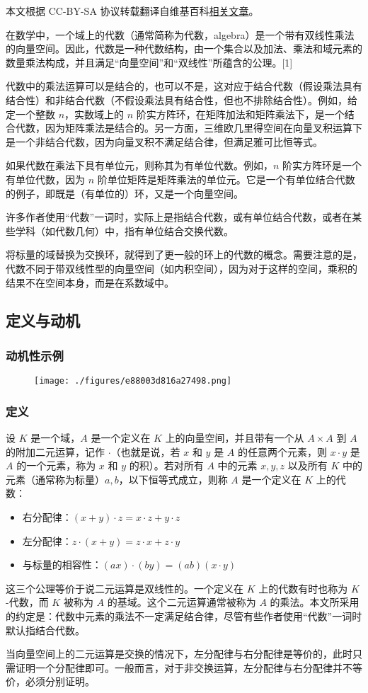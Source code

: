 
本文根据 CC-BY-SA 协议转载翻译自维基百科\href{https://en.wikipedia.org/wiki/Algebra_over_a_field}{相关文章}。

在数学中，一个域上的代数（通常简称为代数，algebra）是一个带有双线性乘法的向量空间。因此，代数是一种代数结构，由一个集合以及加法、乘法和域元素的数量乘法构成，并且满足“向量空间”和“双线性”所蕴含的公理。[1]

代数中的乘法运算可以是结合的，也可以不是，这对应于结合代数（假设乘法具有结合性）和非结合代数（不假设乘法具有结合性，但也不排除结合性）。例如，给定一个整数 $n$，实数域上的 $n$ 阶实方阵环，在矩阵加法和矩阵乘法下，是一个结合代数，因为矩阵乘法是结合的。另一方面，三维欧几里得空间在向量叉积运算下是一个非结合代数，因为向量叉积不满足结合律，但满足雅可比恒等式。

如果代数在乘法下具有单位元，则称其为有单位代数。例如，$n$ 阶实方阵环是一个有单位代数，因为 $n$ 阶单位矩阵是矩阵乘法的单位元。它是一个有单位结合代数的例子，即既是（有单位的）环，又是一个向量空间。

许多作者使用“代数”一词时，实际上是指结合代数，或有单位结合代数，或者在某些学科（如代数几何）中，指有单位结合交换代数。

将标量的域替换为交换环，就得到了更一般的环上的代数的概念。需要注意的是，代数不同于带双线性型的向量空间（如内积空间），因为对于这样的空间，乘积的结果不在空间本身，而是在系数域中。
\subsection{定义与动机}
\subsubsection{动机性示例}
\begin{figure}[ht]
\centering
\texttt{[image: ./figures/e88003d816a27498.png]}
\caption{} \label{fig_YSds_1}
\end{figure}
\subsubsection{定义}
设 $K$ 是一个域，$A$ 是一个定义在 $K$ 上的向量空间，并且带有一个从 $A \times A$ 到 $A$ 的附加二元运算，记作 $\cdot$（也就是说，若 $x$ 和 $y$ 是 $A$ 的任意两个元素，则 $x \cdot y$ 是 $A$ 的一个元素，称为 $x$ 和 $y$ 的积）。若对所有 $A$ 中的元素 $x, y, z$ 以及所有 $K$ 中的元素（通常称为标量）$a, b$，以下恒等式成立，则称 $A$ 是一个定义在 $K$ 上的代数：
\begin{itemize}
\item 右分配律：$(x + y) \cdot z = x \cdot z + y \cdot z$
\item 左分配律：$z \cdot (x + y) = z \cdot x + z \cdot y$
\item 与标量的相容性：$(a x) \cdot (b y) = (ab)(x \cdot y)$
\end{itemize}
这三个公理等价于说二元运算是双线性的。一个定义在 $K$ 上的代数有时也称为 $K$-代数，而 $K$ 被称为 $A$ 的基域。这个二元运算通常被称为 $A$ 的乘法。本文所采用的约定是：代数中元素的乘法不一定满足结合律，尽管有些作者使用“代数”一词时默认指结合代数。

当向量空间上的二元运算是交换的情况下，左分配律与右分配律是等价的，此时只需证明一个分配律即可。一般而言，对于非交换运算，左分配律与右分配律并不等价，必须分别证明。
